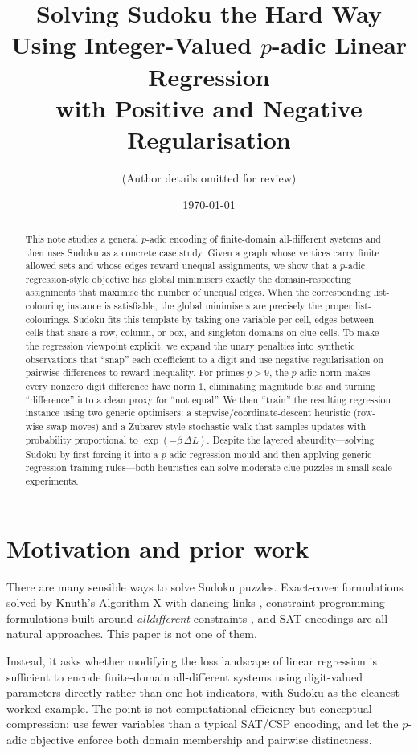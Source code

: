 \documentclass[11pt]{article}
\title{Solving Sudoku the Hard Way Using Integer-Valued $p$-adic Linear Regression\\with Positive and Negative Regularisation}
\author{(Author details omitted for review)}
\date{\today}
\begin{document}
\maketitle

\begin{abstract}
This note studies a general $p$-adic encoding of finite-domain all-different systems and then uses Sudoku as a concrete case study. Given a graph whose vertices carry finite allowed sets and whose edges reward unequal assignments, we show that a $p$-adic regression-style objective has global minimisers exactly the domain-respecting assignments that maximise the number of unequal edges. When the corresponding list-colouring instance is satisfiable, the global minimisers are precisely the proper list-colourings.
Sudoku fits this template by taking one variable per cell, edges between cells that share a row, column, or box, and singleton domains on clue cells. To make the regression viewpoint explicit, we expand the unary penalties into synthetic observations that ``snap'' each coefficient to a digit and use negative regularisation on pairwise differences to reward inequality. For primes $p>9$, the $p$-adic norm makes every nonzero digit difference have norm $1$, eliminating magnitude bias and turning ``difference'' into a clean proxy for ``not equal''.
We then ``train'' the resulting regression instance using two generic optimisers: a stepwise/coordinate-descent heuristic (row-wise swap moves) and a Zubarev-style stochastic walk that samples updates with probability proportional to $\exp(-\beta\,\Delta L)$. Despite the layered absurdity---solving Sudoku by first forcing it into a $p$-adic regression mould and then applying generic regression training rules---both heuristics can solve moderate-clue puzzles in small-scale experiments.
\end{abstract}

\section{Motivation and prior work}
There are many sensible ways to solve Sudoku puzzles. Exact-cover formulations solved by Knuth's Algorithm X with dancing links \cite{knuth2000dancing}, constraint-programming formulations built around \emph{alldifferent} constraints \cite{simonis2005sudoku}, and SAT encodings \cite{lynce2006sudoku} are all natural approaches. This paper is not one of them.

Instead, it asks whether modifying the loss landscape of linear regression is sufficient to encode finite-domain all-different systems using digit-valued parameters directly rather than one-hot indicators, with Sudoku as the cleanest worked example. The point is not computational efficiency but conceptual compression: use fewer variables than a typical SAT/CSP encoding, and let the $p$-adic objective enforce both domain membership and pairwise distinctness.
\end{document}
